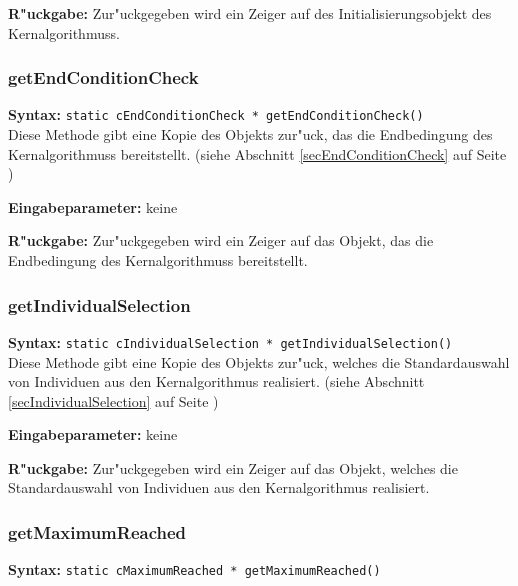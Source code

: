 \bigskip\noindent
\textbf{R"uckgabe:} Zur"uckgegeben wird ein Zeiger auf des Initialisierungsobjekt des Kernalgorithmuss.


\subsubsection{getEndConditionCheck}

\textbf{Syntax:} \verb|static cEndConditionCheck * getEndConditionCheck()| \\

Diese Methode gibt eine Kopie des Objekts zur"uck, das die Endbedingung des Kernalgorithmuss bereitstellt. (siehe Abschnitt \ref{secEndConditionCheck} auf Seite \pageref{secEndConditionCheck})

\bigskip\noindent
\textbf{Eingabeparameter:} keine

\bigskip\noindent
\textbf{R"uckgabe:} Zur"uckgegeben wird ein Zeiger auf das Objekt, das die Endbedingung des Kernalgorithmuss bereitstellt.


\subsubsection{getIndividualSelection}

\textbf{Syntax:} \verb|static cIndividualSelection * getIndividualSelection()| \\

Diese Methode gibt eine Kopie des Objekts zur"uck, welches die Standardauswahl von Individuen aus den Kernalgorithmus realisiert. (siehe Abschnitt \ref{secIndividualSelection} auf Seite \pageref{secIndividualSelection})

\bigskip\noindent
\textbf{Eingabeparameter:} keine

\bigskip\noindent
\textbf{R"uckgabe:} Zur"uckgegeben wird ein Zeiger auf das Objekt, welches die Standardauswahl von Individuen aus den Kernalgorithmus realisiert.


\subsubsection{getMaximumReached}

\textbf{Syntax:} \verb|static cMaximumReached * getMaximumReached()| \\


